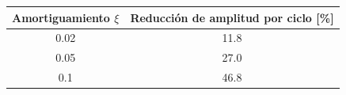 \begin{tabular}{cc}
  \toprule
  Amortiguamiento $\xi$ & Reducción de amplitud por ciclo [\%] \\
  \midrule
  \num{0.02} & \num{11.8} \\
  \num{0.05} & \num{27.0} \\
  \num{0.1} & \num{46.8} \\
  \bottomrule
\end{tabular}
